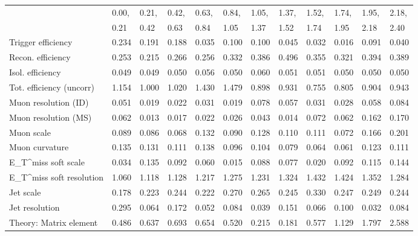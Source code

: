 \begin{tabular}{l|p{0.6cm}p{0.6cm}p{0.6cm}p{0.6cm}p{0.6cm}p{0.6cm}p{0.6cm}p{0.6cm}p{0.6cm}p{0.6cm}p{0.6cm}}
\hline
   & 0.00, & 0.21, & 0.42, & 0.63, & 0.84, & 1.05, & 1.37, & 1.52, & 1.74, & 1.95, & 2.18,  \\ 
   & 0.21 & 0.42 & 0.63 & 0.84 & 1.05 & 1.37 & 1.52 & 1.74 & 1.95 & 2.18 & 2.40  \\ 
\hline
Trigger efficiency                       & 0.234 & 0.191 & 0.188 & 0.035 & 0.100 & 0.100 & 0.045 & 0.032 & 0.016 & 0.091 & 0.040 \\
Recon. efficiency                        & 0.253 & 0.215 & 0.266 & 0.256 & 0.332 & 0.386 & 0.496 & 0.355 & 0.321 & 0.394 & 0.389 \\
Isol. efficiency                         & 0.049 & 0.049 & 0.050 & 0.056 & 0.050 & 0.060 & 0.051 & 0.051 & 0.050 & 0.050 & 0.050 \\
Tot. efficiency (uncorr)                 & 1.154 & 1.000 & 1.020 & 1.430 & 1.479 & 0.898 & 0.931 & 0.755 & 0.805 & 0.904 & 0.943 \\
Muon resolution (ID)                     & 0.051 & 0.019 & 0.022 & 0.031 & 0.019 & 0.078 & 0.057 & 0.031 & 0.028 & 0.058 & 0.084 \\
Muon resolution (MS)                     & 0.062 & 0.013 & 0.017 & 0.022 & 0.026 & 0.043 & 0.014 & 0.072 & 0.062 & 0.162 & 0.170 \\
Muon scale                               & 0.089 & 0.086 & 0.068 & 0.132 & 0.090 & 0.128 & 0.110 & 0.111 & 0.072 & 0.166 & 0.201 \\
Muon curvature                           & 0.135 & 0.131 & 0.111 & 0.138 & 0.096 & 0.104 & 0.079 & 0.064 & 0.061 & 0.123 & 0.111 \\
E_{T}^{miss} soft scale                  & 0.034 & 0.135 & 0.092 & 0.060 & 0.015 & 0.088 & 0.077 & 0.020 & 0.092 & 0.115 & 0.144 \\
E_{T}^{miss} soft resolution             & 1.060 & 1.118 & 1.128 & 1.217 & 1.275 & 1.231 & 1.324 & 1.432 & 1.424 & 1.352 & 1.284 \\
Jet scale                                & 0.178 & 0.223 & 0.244 & 0.222 & 0.270 & 0.265 & 0.245 & 0.330 & 0.247 & 0.249 & 0.244 \\
Jet resolution                           & 0.295 & 0.064 & 0.172 & 0.052 & 0.084 & 0.039 & 0.151 & 0.066 & 0.100 & 0.032 & 0.084 \\
Theory: Matrix element                   & 0.486 & 0.637 & 0.693 & 0.654 & 0.520 & 0.215 & 0.181 & 0.577 & 1.129 & 1.797 & 2.588 \\

\end{tabular}
